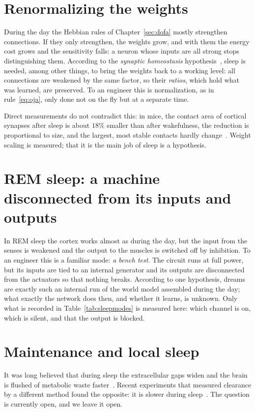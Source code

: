 \section{Renormalizing the weights}

During the day the Hebbian rules of Chapter~\ref{sec:dofa} mostly strengthen connections. If they only strengthen, the weights grow, and with them the energy cost grows and the sensitivity falls: a neuron whose inputs are all strong stops distinguishing them. According to the \emph{synaptic homeostasis} hypothesis~\cite{TononiCirelli2014}, sleep is needed, among other things, to bring the weights back to a working level: all connections are weakened by the same factor, so their \emph{ratios}, which hold what was learned, are preserved. To an engineer this is normalization, as in rule~\eqref{eq:oja}, only done not on the fly but at a separate time.

Direct measurements do not contradict this: in mice, the contact area of cortical synapses after sleep is about $18\%$ smaller than after wakefulness, the reduction is proportional to size, and the largest, most stable contacts hardly change~\cite{deVivo2017}. Weight scaling is measured; that it is the main job of sleep is a hypothesis.

\section{REM sleep: a machine disconnected from its inputs and outputs}

In REM sleep the cortex works almost as during the day, but the input from the senses is weakened and the output to the muscles is switched off by inhibition. To an engineer this is a familiar mode: \emph{a bench test}. The circuit runs at full power, but its inputs are tied to an internal generator and its outputs are disconnected from the actuators so that nothing breaks. According to one hypothesis, dreams are exactly such an internal run of the world model assembled during the day; what exactly the network does then, and whether it learns, is unknown. Only what is recorded in Table~\ref{tab:sleepmodes} is measured here: which channel is on, which is silent, and that the output is blocked.

\section{Maintenance and local sleep}

It was long believed that during sleep the extracellular gaps widen and the brain is flushed of metabolic waste faster~\cite{Xie2013}. Recent experiments that measured clearance by a different method found the opposite: it is slower during sleep~\cite{Miao2024}. The question is currently open, and we leave it open.


